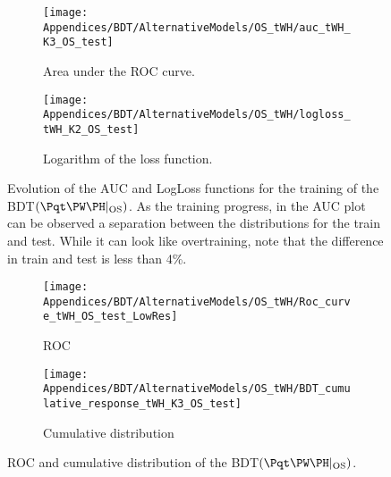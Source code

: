 \begin{figure}[h]
\centering
\begin{subfigure}{.475\textwidth}
  \centering
  \texttt{[image: Appendices/BDT/AlternativeModels/OS\_tWH/auc\_tWH\_K3\_OS\_test]}
  \caption{Area under the ROC curve.}
  \label{fig:BDT:AltModels:tWHOS:AUC}
\end{subfigure}%
\begin{subfigure}{.475\textwidth}
  \centering
  \texttt{[image: Appendices/BDT/AlternativeModels/OS\_tWH/logloss\_tWH\_K2\_OS\_test]}
  \caption{Logarithm of the loss function.}
  \label{fig:BDT:AltModels:tWHOS:LogLoss}
\end{subfigure}
\caption{Evolution of the AUC and LogLoss functions for the training of the BDT$(\tWH|_{\text{OS}})$.
As the training progress, in the AUC plot can be observed a separation between the distributions for the 
train and test. While it can look like overtraining, note that the difference in train and test is less than 4\%.}
\label{fig:BDT:AltModels:Epochs:tWHOS}
\end{figure}


\begin{figure}[h]
\centering
\begin{subfigure}{.475\textwidth}
  \centering
  \texttt{[image: Appendices/BDT/AlternativeModels/OS\_tWH/Roc\_curve\_tWH\_OS\_test\_LowRes]}
  \caption{ROC}
  \label{fig:BDT:AltModels:tWHOS:ROC}
\end{subfigure}%
\begin{subfigure}{.5\textwidth}
  \centering
  \texttt{[image: Appendices/BDT/AlternativeModels/OS\_tWH/BDT\_cumulative\_response\_tWH\_K3\_OS\_test]}
  \caption{Cumulative distribution}
  \label{fig:BDT:AltModels:tWHOS:Score}
\end{subfigure}
\caption{ROC and cumulative distribution of the BDT$(\tWH|_{\text{OS}})$.}
\label{fig:BDT:AltModels:Result:tWHOS}
\end{figure}


